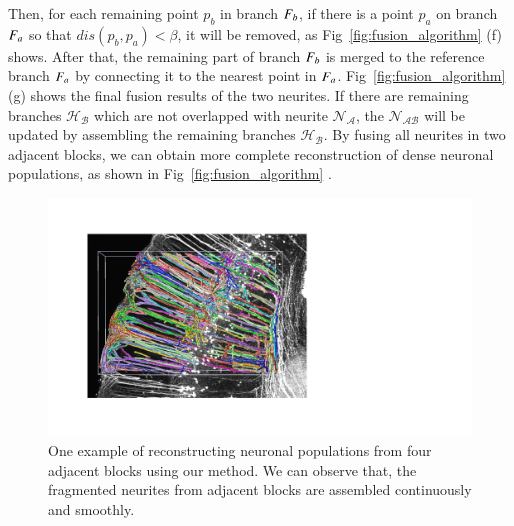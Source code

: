 Then, for each remaining point $p_b$ in branch $F_b$, if there is a point $p_a$ on branch $F_a$ so that $dis(p_b,p_a)<\beta$, it will be removed, as Fig~\ref{fig:fusion_algorithm} (f) shows. 
%
After that, the remaining part of branch $F_b$ is merged to the reference branch $F_a$ by connecting it to the nearest point in $F_a$.
%
Fig~\ref{fig:fusion_algorithm} (g) shows the final fusion results of the two neurites. 
%
If there are remaining branches $\mathcal{H_B}$ which are not overlapped with neurite $\mathcal{N_A}$, the $\mathcal{N_{AB}}$ will be updated by assembling the remaining branches $\mathcal{H_B}$.
%
By fusing all neurites in two adjacent blocks, we can obtain more complete reconstruction of dense neuronal populations, as shown in Fig~\ref{fig:fusion_algorithm} .
 
\begin{figure}[t]
	\centering
	\includegraphics[width=1\columnwidth]{./Illustrations/trace_four_blocks2.pdf}
	\caption{One example of reconstructing neuronal populations from four adjacent blocks using our method. We can observe that, the fragmented neurites from adjacent blocks are assembled continuously and smoothly.}
	\label{fig:reconstruct_blocks}
\end{figure}
 

